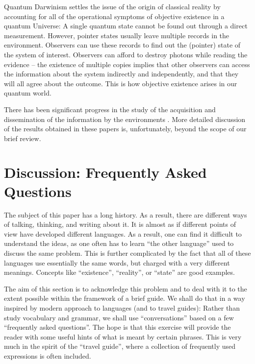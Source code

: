 \documentclass[aps,amsmath,amssymb,amsfonts,12pt]{revtex4-1}
\newcommand{\+}         {\dagger}
\begin{document}
{{{Quantum Darwinism settles the issue of the origin of classical reality by accounting for all of the operational symptoms of objective existence
in a quantum Universe: A single quantum state cannot be found out through a direct
measurement. However, pointer states usually leave multiple records in the environment. Observers can use these
records to find out the (pointer) state of the system of interest. Observers can afford to destroy photons while
reading the evidence -- the existence of multiple copies implies that other observers can access
the information about the system indirectly and independently, and that they will all agree about
the outcome.  This is how objective existence arises in our quantum world. 

There has been significant progress in the study of the acquisition and dissemination of the information by the environments \cite{QD}. More detailed discussion of the results obtained in these papers is, unfortunately, beyond the scope of our brief review.


\section{Discussion: Frequently Asked Questions}

The subject of this paper has a long history. As a result, there are different ways of talking, thinking, and writing about it. It is almost as if different points of view have developed different languages. As a result, one can find it difficult to understand the ideas, as one often has to learn ``the other language'' used to discuss the same problem. This is further complicated by the fact that all of these languages use essentially the same words, but charged with a very different meanings. Concepts like ``existence'', ``reality'', or ``state'' are good examples.

The aim of this section is to acknowledge this problem and to deal with it to the extent possible within the framework of a brief guide. We shall do that in a way inspired by modern approach to languages (and to travel guides): Rather than study vocabulary and grammar, we shall use ``conversations'' based on a few ``frequently asked questions''. 
The hope is that this exercise will provide the reader with some useful hints of what is meant by certain phrases. This is very much in the spirit of the ``travel guide'', where a collection of frequently used expressions is often included.

}}}
\end{document}
